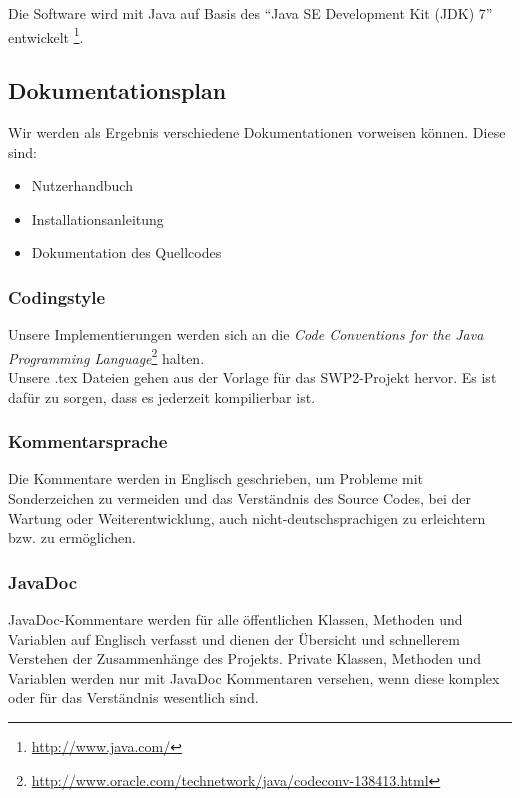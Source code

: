 \documentclass[fontsize=12pt,paper=a4,twoside]{scrartcl}
\begin{document}
Die Software wird mit Java auf Basis des "`Java SE Development Kit (JDK) 7"' entwickelt \footnote{\url{http://www.java.com/}}.\\

\subsection{Dokumentationsplan}
Wir werden als Ergebnis verschiedene Dokumentationen vorweisen können. Diese sind:

\begin{itemize}
\item{Nutzerhandbuch}
\item{Installationsanleitung}
\item{Dokumentation des Quellcodes}
\end{itemize}

\subsubsection{Codingstyle}
Unsere Implementierungen werden sich an die \emph{Code Conventions for the Java Programming Language}\footnote{\url{http://www.oracle.com/technetwork/java/codeconv-138413.html}} halten.\\
Unsere .tex Dateien gehen aus der Vorlage für das SWP2-Projekt hervor. Es ist dafür zu sorgen, dass es jederzeit kompilierbar ist.


\subsubsection{Kommentarsprache}

Die Kommentare werden in Englisch geschrieben, um Probleme mit Sonderzeichen zu vermeiden und das Verständnis des Source Codes, bei der Wartung oder Weiterentwicklung, auch nicht-deutschsprachigen zu erleichtern bzw. zu ermöglichen.

\subsubsection{JavaDoc}

JavaDoc-Kommentare werden für alle öffentlichen Klassen, Methoden und Variablen auf Englisch verfasst und dienen der Übersicht und schnellerem Verstehen der Zusammenhänge des Projekts.
Private Klassen, Methoden und Variablen werden nur mit JavaDoc Kommentaren versehen, wenn diese komplex oder für das Verständnis wesentlich sind.
\end{document}
